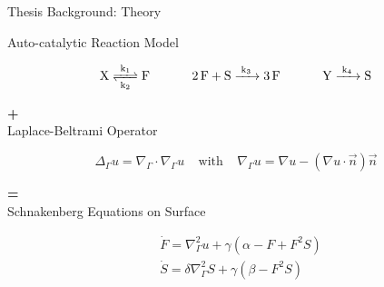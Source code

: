 \documentclass{beamer}
\begin{document}
        \begin{frame}{Thesis Background: Theory}
         


            \begin{center}
                    {\large Auto-catalytic Reaction Model}\\
                    \vspace{-5mm}
                    
                    \begin{large}
                    $$ \ce{X <=>[k_1][k_2] F} ~~~~~~~~~~ \ce{2F + S ->[k_3] 3F} ~~~~~~~~~~ \ce{Y ->[k_4] S} $$
                    \end{large}
                    
                    \vspace{-5mm}
                    {\Huge \textbf{+}} \\
                    
                    {\large Laplace-Beltrami Operator}\\
                    \vspace{-5mm}
                    
                    \begin{equation*}
                        \label{Laplace-Beltrami}
                        \Delta_\Gamma u = \nabla_\Gamma\cdot\nabla_\Gamma u ~~~~~ \text{with} ~~~~~ \nabla_\Gamma u = \nabla u-(\nabla u\cdot\vec{n})\vec{n}
                    \end{equation*}
                    \vspace{-5mm}
                    
                    {\Huge \textbf{=}} \\
                    
                    
                    {\large Schnakenberg Equations on Surface}\\
                    \vspace{-5mm}
                    
                    \begin{equation*}
                        \begin{aligned}
                            & \dot{F} = \nabla^2_\Gamma u + 
                            \gamma\left(\alpha - F + F^2S\right)\\
                            & \dot{S} = \delta\nabla^2_\Gamma S + 
                            \gamma\left(\beta - F^2S\right)\\
                        \end{aligned}
                    \end{equation*}
                    
                \end{center}
            
        \end{frame}
        
\end{document}
